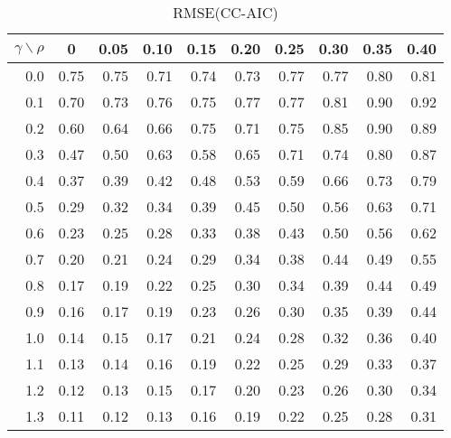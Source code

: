 \documentclass[12pt]{article}
\begin{document}
%
\begin{table}[!tbp]
\caption{RMSE(CC-AIC)}
 \begin{center}
 \begin{tabular}{r|rrrrrrrrr}\hline\hline
\multicolumn{1}{c|}{$\gamma\backslash\rho$}&\multicolumn{1}{c}{0}&\multicolumn{1}{c}{0.05}&\multicolumn{1}{c}{0.10}&\multicolumn{1}{c}{0.15}&\multicolumn{1}{c}{0.20}&\multicolumn{1}{c}{0.25}&\multicolumn{1}{c}{0.30}&\multicolumn{1}{c}{0.35}&\multicolumn{1}{c}{0.40}\tabularnewline
\hline

0.0&0.75&0.75&0.71&0.74&0.73&0.77&0.77&0.80&0.81\tabularnewline
0.1&0.70&0.73&0.76&0.75&0.77&0.77&0.81&0.90&0.92\tabularnewline
0.2&0.60&0.64&0.66&0.75&0.71&0.75&0.85&0.90&0.89\tabularnewline
0.3&0.47&0.50&0.63&0.58&0.65&0.71&0.74&0.80&0.87\tabularnewline
0.4&0.37&0.39&0.42&0.48&0.53&0.59&0.66&0.73&0.79\tabularnewline
0.5&0.29&0.32&0.34&0.39&0.45&0.50&0.56&0.63&0.71\tabularnewline
0.6&0.23&0.25&0.28&0.33&0.38&0.43&0.50&0.56&0.62\tabularnewline
0.7&0.20&0.21&0.24&0.29&0.34&0.38&0.44&0.49&0.55\tabularnewline
0.8&0.17&0.19&0.22&0.25&0.30&0.34&0.39&0.44&0.49\tabularnewline
0.9&0.16&0.17&0.19&0.23&0.26&0.30&0.35&0.39&0.44\tabularnewline
1.0&0.14&0.15&0.17&0.21&0.24&0.28&0.32&0.36&0.40\tabularnewline
1.1&0.13&0.14&0.16&0.19&0.22&0.25&0.29&0.33&0.37\tabularnewline
1.2&0.12&0.13&0.15&0.17&0.20&0.23&0.26&0.30&0.34\tabularnewline
1.3&0.11&0.12&0.13&0.16&0.19&0.22&0.25&0.28&0.31\tabularnewline
\hline
\end{tabular}

\end{center}

\end{table}
\end{document}
